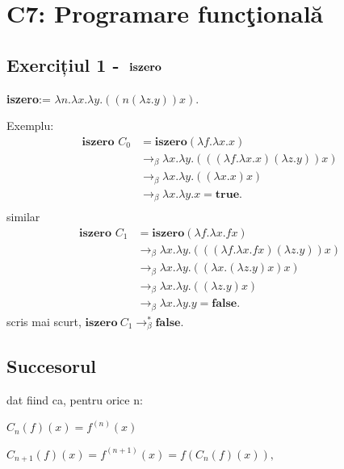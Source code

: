 \section*{C7: Programare funcţională}

\subsection{Exercițiul 1 - \( \;\mathrm{\mathbf{iszero}}\; \)}
\begin{center}
	\textbf{iszero}:= $\lambda n.\lambda x.\lambda y.((n(\lambda z.y))x)$.
\end{center}
Exemplu:
\begin{align*}
	\textbf{iszero } C_0 & = \textbf{iszero} (\lambda f.\lambda x.x)                               \\
	                     & \to_\beta \lambda x.\lambda y.(((\lambda f.\lambda x.x)(\lambda z.y))x) \\
	                     & \to_\beta \lambda x.\lambda y.((\lambda x.x)x)                          \\
	                     & \to_\beta \lambda x.\lambda y.x= \textbf{true}.                         \\
\end{align*}
similar
\begin{align*}
	\textbf{iszero } C_1 & = \textbf{iszero} (\lambda f.\lambda x.fx)                               \\
	                     & \to_\beta \lambda x.\lambda y.(((\lambda f.\lambda x.fx)(\lambda z.y))x) \\
	                     & \to_\beta \lambda x.\lambda y.((\lambda x.(\lambda z.y)x)x)              \\
	                     & \to_\beta \lambda x.\lambda y.((\lambda z.y)x)                           \\
	                     & \to_\beta \lambda x.\lambda y.y = \textbf{false}.
\end{align*}
scris mai scurt, $\textbf{iszero}\ C_1 \to_\beta^* \textbf{false}$.

\subsection{Succesorul}
dat fiind ca, pentru orice n:

\begin{center}
	$C_n(f)(x)=f^{(n)}(x)$
\end{center}
\begin{center}
	$C_{n+1}(f)(x)=f^{(n+1)}(x)=f(C_n(f)(x)),$
\end{center}

